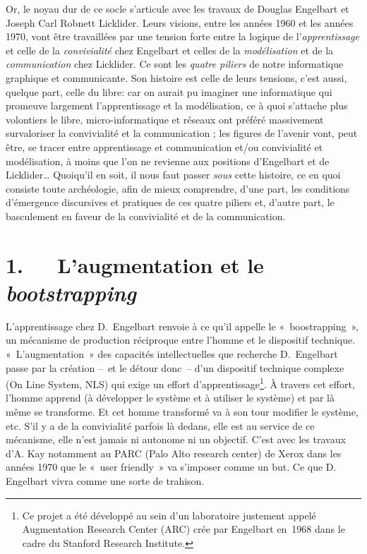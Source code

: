 \documentclass{FramateX}
\begin{document}
\begin{refsection}
Or, le noyau dur de ce socle s'articule avec les travaux de Douglas Engelbart et
Joseph Carl Robnett Licklider. Leurs visions, entre les années 1960 et les années 1970,
vont être travaillées par une tension forte entre la logique de
l'\textit{apprentissage} et celle de la \textit{convivialité} chez Engelbart et celles de la \textit{modélisation} et de la
\textit{communication} chez Licklider. Ce sont les \textit{quatre
piliers} de notre informatique graphique et communicante. Son histoire
est celle de leurs tensions, c'est aussi, quelque part, celle du libre: car on aurait pu imaginer une informatique qui promeuve largement
l'apprentissage et la modélisation, ce à quoi s'attache plus volontiers
le libre, micro-informatique et réseaux ont préféré massivement
survaloriser la convivialité et la communication ; les figures de
l'avenir vont, peut être, se tracer entre apprentissage et
communication et/ou convivialité et modélisation, à moins que l'on ne
revienne aux positions d'Engelbart et de Licklider… Quoiqu'il en soit,
il nous faut passer \textit{sous} cette histoire, ce en quoi consiste
toute archéologie, afin de mieux comprendre, d'une part, les conditions
d'émergence discursives et pratiques de ces quatre piliers et, d'autre
part, le basculement en faveur de la convivialité et de la
communication. 




\section*{1.~~~L'augmentation et le \textit{bootstrapping}}
{}

L'apprentissage chez D.~Engelbart renvoie à ce qu'il appelle le
«~boostrapping~», un mécanisme de production réciproque entre l'homme
et le dispositif technique. «~L'augmentation~» des capacités
intellectuelles que recherche D.~Engelbart passe par la création –~et le
détour donc~-- d'un dispositif technique complexe (On Line System, NLS)
qui exige un effort d'apprentissage\footnote{Ce projet a été développé
au sein d'un laboratoire justement appelé Augmentation Research Center
(ARC) crée par Engelbart en~1968 dans le cadre du Stanford Research
Institute.}. À travers cet effort, l'homme apprend (à développer le
système et à utiliser le système) et par là même se transforme. Et cet
homme transformé va à son tour modifier le système, etc. S'il y a de la
convivialité parfois là dedans, elle est au service de ce mécanisme,
elle n'est jamais ni autonome ni un objectif. C'est avec les travaux
d'A. Kay notamment au PARC (Palo Alto research center) de Xerox dans
les années 1970 que le «~user friendly~» va s'imposer comme un but. Ce que
D. Engelbart vivra comme une sorte de trahison. 


\end{refsection}
\end{document}
